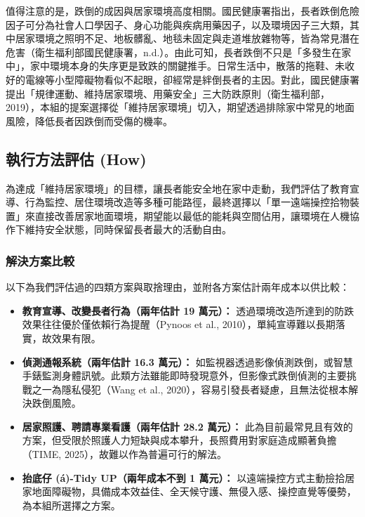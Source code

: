 \documentclass[12pt]{article}
\begin{document}
值得注意的是，跌倒的成因與居家環境高度相關。國民健康署指出，長者跌倒危險因子可分為社會人口學因子、身心功能與疾病用藥因子，以及環境因子三大類，其中居家環境之照明不足、地板髒亂、地毯未固定與走道堆放雜物等，皆為常見潛在危害（衛生福利部國民健康署，n.d.）。由此可知，長者跌倒不只是「多發生在家中」，家中環境本身的失序更是致跌的關鍵推手。日常生活中，散落的拖鞋、未收好的電線等小型障礙物看似不起眼，卻經常是絆倒長者的主因。對此，國民健康署提出「規律運動、維持居家環境、用藥安全」三大防跌原則（衛生福利部，2019），本組的提案選擇從「維持居家環境」切入，期望透過排除家中常見的地面風險，降低長者因跌倒而受傷的機率。

\subsection{執行方法評估 (How)}

為達成「維持居家環境」的目標，讓長者能安全地在家中走動，我們評估了教育宣導、行為監控、居住環境改造等多種可能路徑，最終選擇以「單一遠端操控拾物裝置」來直接改善居家地面環境，期望能以最低的能耗與空間佔用，讓環境在人機協作下維持安全狀態，同時保留長者最大的活動自由。

\subsubsection{解決方案比較}

以下為我們評估過的四類方案與取捨理由，並附各方案估計兩年成本以供比較：

\begin{itemize}
  \setlength{\itemsep}{0.5em}
  \item \textbf{教育宣導、改變長者行為（兩年估計 19 萬元）：} 透過環境改造所達到的防跌效果往往優於僅依賴行為提醒（Pynoos et al., 2010），單純宣導難以長期落實，故效果有限。
  \item \textbf{偵測通報系統（兩年估計 16.3 萬元）：} 如監視器透過影像偵測跌倒，或智慧手錶監測身體訊號。此類方法雖能即時發現意外，但影像式跌倒偵測的主要挑戰之一為隱私侵犯（Wang et al., 2020），容易引發長者疑慮，且無法從根本解決跌倒風險。
  \item \textbf{居家照護、聘請專業看護（兩年估計 28.2 萬元）：} 此為目前最常見且有效的方案，但受限於照護人力短缺與成本攀升，長照費用對家庭造成顯著負擔（TIME, 2025），故難以作為普遍可行的解法。
  \item \textbf{抬底仔 (á)-Tidy UP（兩年成本不到 1 萬元）：} 以遠端操控方式主動撿拾居家地面障礙物，具備成本效益佳、全天候守護、無侵入感、操控直覺等優勢，為本組所選擇之方案。
\end{itemize}
\end{document}
